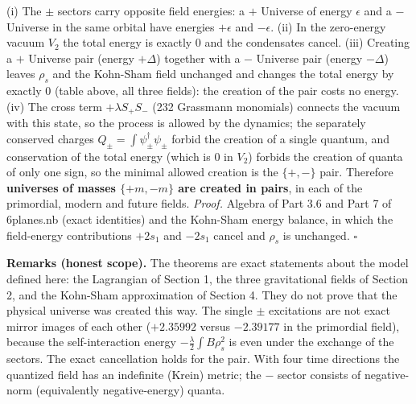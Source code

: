 \documentclass[10pt]{article}
\begin{document}
(i) The $\pm$ sectors carry opposite field energies: a $+$ Universe of energy $\epsilon$ and a $-$ Universe in the same orbital have energies $+\epsilon$ and $-\epsilon$. (ii) In the zero-energy vacuum $V_2$ the total energy is exactly 0 and the condensates cancel. (iii) Creating a $+$ Universe pair (energy $+\Delta$) together with a $-$ Universe pair (energy $-\Delta$) leaves $\rho_s$ and the Kohn-Sham field unchanged and changes the total energy by exactly 0 (table above, all three fields): the creation of the pair costs no energy. (iv) The cross term $+\lambda S_+S_-$ (232 Grassmann monomials) connects the vacuum with this state, so the process is allowed by the dynamics; the separately conserved charges $Q_\pm = \int\psi_\pm^\dagger\psi_\pm$ forbid the creation of a single quantum, and conservation of the total energy (which is 0 in $V_2$) forbids the creation of quanta of only one sign, so the minimal allowed creation is the $\{+,-\}$ pair. Therefore \textbf{universes of masses $\{+m, -m\}$ are created in pairs}, in each of the primordial, modern and future fields. \emph{Proof.} Algebra of Part 3.6 and Part 7 of 6planes.nb (exact identities) and the Kohn-Sham energy balance, in which the field-energy contributions $+2s_1$ and $-2s_1$ cancel and $\rho_s$ is unchanged. $\square$


\textbf{Remarks (honest scope).} The theorems are exact statements about the model defined here: the Lagrangian of Section 1, the three gravitational fields of Section 2, and the Kohn-Sham approximation of Section 4. They do not prove that the physical universe was created this way. The single $\pm$ excitations are not exact mirror images of each other ($+2.35992$ versus $-2.39177$ in the primordial field), because the self-interaction energy $-\frac\lambda2\int B\rho_s^2$ is even under the exchange of the sectors. The exact cancellation holds for the pair. With four time directions the quantized field has an indefinite (Krein) metric; the $-$ sector consists of negative-norm (equivalently negative-energy) quanta.
\end{document}
